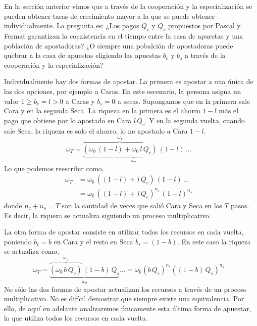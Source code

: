 \documentclass[a4paper,10pt]{book}
\theoremstyle{definition}
\begin{document}

En la secci\'on anterior vimos que a trav\'es de la cooperaci\'on y la especializaci\'on se pueden obtener tasas de crecimiento mayor a la que se puede obtener individualmente.
%
La pregunta es: ¿Los pagos $Q_c$ y $Q_s$ propuestos por Pascal y Fermat garantizan la coexistencia en el tiempo entre la casa de apuestas y una poblaci\'on de apostadoras?
%
¿O siempre una pobalci\'on de apostadoras puede quebrar a la casa de apuestas eligiendo las apuestas $b_c$ y $b_s$ a trav\'es de la cooperaci\'on y la especializaci\'on?


Individualmente hay dos formas de apostar.
%
La primera es apostar a una única de las dos opciones, por ejemplo a Caras.
%
En este escenario, la persona asigna un valor $ 1 \geq b_c = l > 0 $ a Caras y $b_s = 0$ a secas.
%
Supongamos que en la primera sale Cara y en la segunda Seca.
%
La riqueza en la primera es el ahorro $1-l$ m\'as el pago que obtiene por lo apostado en Cara $l \, Q_c$.
%
Y en la segunda vuelta, cuando sale Seca, la riqueza es solo el ahorro, lo no apostado a Cara $1-l$.
%
\begin{equation}
\omega_T = \underbrace{\overbrace{(\omega_0 \, (1-l) + \omega_0 \, l \, Q_c )}^{\omega_1} \, (1-l)}_{\omega_2} \,\dots
\end{equation}
%
Lo que podemos reescribir como,
%
\begin{equation}
\begin{split}
\omega_T &= \omega_0 \, ((1-l) + \, l \, Q_c ) \, (1-l) \, \dots \\
 &= \omega_0 \, ( (1-l) + \, l \, Q_c )^{n_c} \, (1-l)^{n_s} 
\end{split}
\end{equation}
%
donde $n_c + n_s = T$ son la cantidad de veces que sali\'o Cara y Seca en los $T$ pasos.
%
Es decir, la riqueza se actualiza siguiendo un proceso multiplicativo.


La otra forma de apostar consiste en utilizar todos los recursos en cada vuelta, poniendo $b_c = b$ en Cara y el resto en Seca $b_s = (1-b)$.
%
En este caso la riqueza se actualiza como,
%
\begin{equation} \label{eq:kelly_paraconsistente}
\omega_T = \underbrace{\overbrace{(\omega_0 \, b \, Q_c)}^{\omega_1} \,  (1-b) \, Q_s}_{\omega_2} \dots = \omega_0 (b \, Q_c)^{n_c} ((1-b) \, Q_s )^{n_s}
\end{equation}
%
No s\'olo las dos formas de apostar actualizan los recursos a trav\'es de un proceso multiplicativo. 
%
No es dif\'icil demostrar que siempre existe una equivalencia.
%
Por ello, de aqu\'i en adelante analizaremos únicamente esta última forma de apuestar, la que utiliza todos los recursos en cada vuelta.
\end{document}
